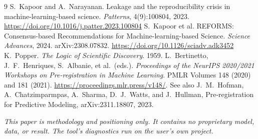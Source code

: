 \documentclass[11pt]{article}
\begin{document}
\begin{thebibliography}{9}
 S.~Kapoor and A.~Narayanan. Leakage and the reproducibility crisis in
machine-learning-based science. \emph{Patterns}, 4(9):100804, 2023.
\url{https://doi.org/10.1016/j.patter.2023.100804}
 S.~Kapoor et al. REFORMS: Consensus-based Recommendations for
Machine-learning-based Science. \emph{Science Advances}, 2024. arXiv:2308.07832.
\url{https://doi.org/10.1126/sciadv.adk3452}
 K.~Popper. \emph{The Logic of Scientific Discovery}. 1959.
 L.~Bertinetto, J.~F.~Henriques, S.~Albanie, et al.\ (eds.).
\emph{Proceedings of the NeurIPS 2020/2021 Workshops on Pre-registration in Machine Learning}.
PMLR Volumes 148 (2020) and 181 (2021). \url{https://proceedings.mlr.press/v148/}. See also
J.~M.~Hofman, A.~Chatzimparmpas, A.~Sharma, D.~J.~Watts, and J.~Hullman, Pre-registration for
Predictive Modeling, arXiv:2311.18807, 2023.
\end{thebibliography}

\vspace{1em}
\noindent\textit{\small This paper is methodology and positioning only. It contains no proprietary
model, data, or result. The tool's diagnostics run on the user's own project.}
\end{document}
